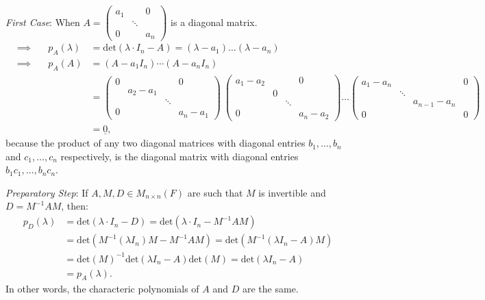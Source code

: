 \documentclass[
  12pt,
  a4paper,
  twoside]{article}
\theoremstyle{plain}
\theoremstyle{definition}
\begin{document}
\emph{First Case}: When \(A = \left(\begin{smallmatrix} a_{1} & & 0 \\ & \ddots & \\ 0 & & a_{n} \end{smallmatrix}\right)\) is a diagonal matrix.
\begin{align*}
&\implies&\quad p_{A}(\lambda) &= \mathrm{det}(\lambda\cdot I_n-A) = (\lambda - a_{1}) \dots (\lambda - a_{n})\\
&\implies&\quad p_{A}(A) &= (A - a_{1}I_{n}) \cdots (A - a_{n}I_{n})\\
&&&= \left( \begin{smallmatrix} 0 & & & 0 \\ & a_{2} - a_{1} & & \\ & & \ddots & \\ 0 & & & a_{n} - a_{1} \end{smallmatrix} \right) \ \left( \begin{smallmatrix} a_{1} - a_{2} & & & 0 \\ & 0 & & \\ & & \ddots & \\ 0 & & & a_{n} - a_{2} \end{smallmatrix} \right)  \dots \left( \begin{smallmatrix} a_{1} - a_{n} & & & 0 \\ & \ddots& & \\ & &  a_{n-1} - a_n \\ 0 & & & 0 \end{smallmatrix} \right) \\
&&&= \underline{0},
\end{align*}
because the product of any two diagonal matrices with diagonal entries \(b_{1}, \dots, b_{n}\) and \(c_{1}, \dots, c_{n}\) respectively, is the diagonal matrix with diagonal entries \(b_{1}c_{1}, \dots, b_{n}c_{n}\).

\emph{Preparatory Step}: If \(A,M,D\in M_{n\times n}(F)\) are such that \(M\) is invertible and \(D = M^{-1}AM\), then:
\begin{align*}
p_D(\lambda) &=
\mathrm{det}(\lambda\cdot I_n-D) = \mathrm{det}(\lambda\cdot I_n-M^{-1}AM)\\
&= \mathrm{det}(M^{-1}(\lambda I_n)M - M^{-1}AM) = \mathrm{det}(M^{-1}(\lambda I_n-A)M)\\
&= \mathrm{det}(M)^{-1}\mathrm{det}(\lambda I_n -A)\mathrm{det}(M) = \mathrm{det}(\lambda I_n -A)\\
&= p_A(\lambda).
\end{align*}
In other words, the characteric polynomials of \(A\) and \(D\) are the same.
\end{document}
